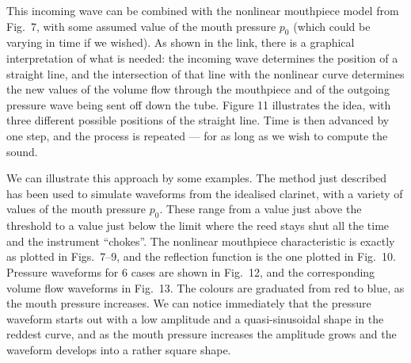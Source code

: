   This incoming wave can be combined with the nonlinear mouthpiece model from 
  Fig.\ 7, with some assumed value of the mouth pressure $p_0$ (which could be 
  varying in time if we wished). As shown in the link, there is a graphical 
  interpretation of what is needed: the incoming wave determines the position 
  of a straight line, and the intersection of that line with the nonlinear 
  curve determines the new values of the volume flow through the mouthpiece and 
  of the outgoing pressure wave being sent off down the tube. Figure 11 
  illustrates the idea, with three different possible positions of the straight 
  line. Time is then advanced by one step, and the process is repeated — for as 
  long as we wish to compute the sound. 


  We can illustrate this approach by some examples. The method just described 
  has been used to simulate waveforms from the idealised clarinet, with a 
  variety of values of the mouth pressure $p_0$. These range from a value just 
  above the threshold to a value just below the limit where the reed stays shut 
  all the time and the instrument ``chokes''. The nonlinear mouthpiece 
  characteristic is exactly as plotted in Figs.\ 7--9, and the reflection 
  function is the one plotted in Fig.\ 10. Pressure waveforms for 6 cases are 
  shown in Fig.\ 12, and the corresponding volume flow waveforms in Fig.\ 13. 
  The colours are graduated from red to blue, as the mouth pressure increases. 
  We can notice immediately that the pressure waveform starts out with a low 
  amplitude and a quasi-sinusoidal shape in the reddest curve, and as the mouth 
  pressure increases the amplitude grows and the waveform develops into a 
  rather square shape. 



